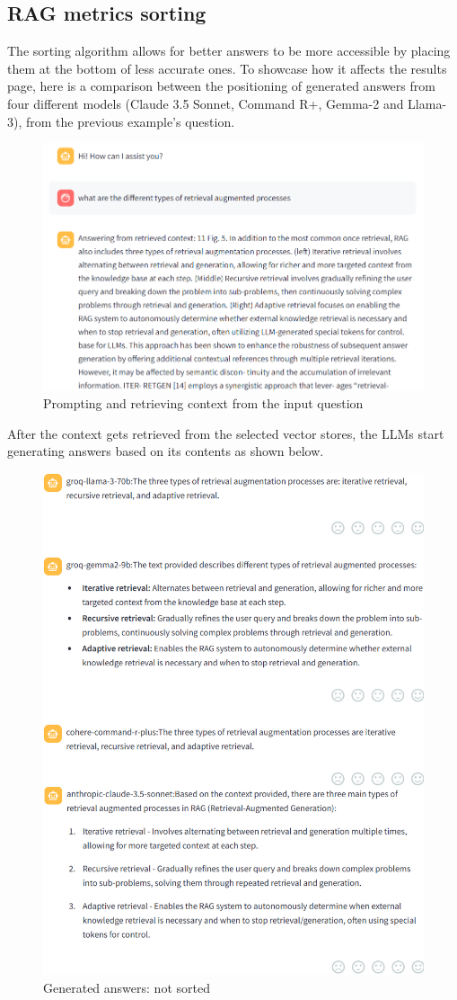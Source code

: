 \subsection{RAG metrics sorting}
The sorting algorithm allows for better answers to be more accessible by placing them at the bottom of less accurate ones.
To showcase how it affects the results page, here is a comparison between the positioning of generated answers from four different models (Claude 3.5 Sonnet, Command R+, Gemma-2 and Llama-3), from the previous example's question.
\begin{figure}[htbp]
    \centering
    \includegraphics[width=\linewidth]{./figures/app-question.png}
    \caption{Prompting and retrieving context from the input question}
\end{figure}\newpage
After the context gets retrieved from the selected vector stores, the LLMs start generating answers based on its contents as shown below.
\begin{figure}[htbp]
    \centering
    \includegraphics[width=.8\linewidth]{./figures/app-answers.png}
    \caption{Generated answers: not sorted}
\end{figure}
